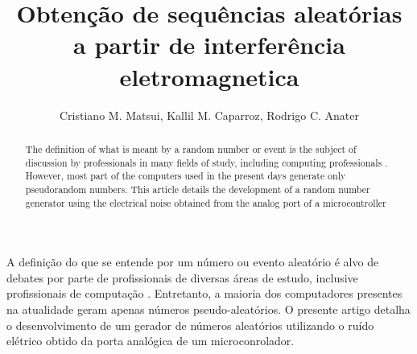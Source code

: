 \documentclass[
12pt,				%
openright,			%
twoside,			%
a4paper,			%
sumario=tradicional, %
hidelinks,          %
num,				%
bibjustif,			%
brackets,			%
english,			%
brazil				%
]{article}       %
\title{Obtenção de sequências aleatórias a partir de interferência eletromagnetica}
\author{Cristiano M. Matsui\inst{1}, Kallil M. Caparroz\inst{2}, Rodrigo C. Anater\inst{3} }
\begin{document}
 

  \maketitle

\begin{abstract} 	
 	The definition of what is meant by a random number or event is the subject of discussion by professionals in many fields of study, including computing professionals \cite{volchan2001algorithmic}. However, most part of the computers used in the present days generate only pseudorandom numbers. This article details the development of a random number generator using the electrical noise obtained from the analog port of a microcontroller
\end{abstract}
     
\begin{resumo} 
 	A definição do que se entende por um número ou evento aleatório é alvo de debates por parte de profissionais de diversas áreas de estudo, inclusive profissionais de computação \cite{volchan2001algorithmic}. Entretanto, a maioria dos computadores presentes na atualidade geram apenas números pseudo-aleatórios. O presente artigo detalha o desenvolvimento de um gerador de números aleatórios utilizando o ruído elétrico obtido da porta analógica de um microconrolador.  
\end{resumo}









\nocite{park1988random}


\end{document}

